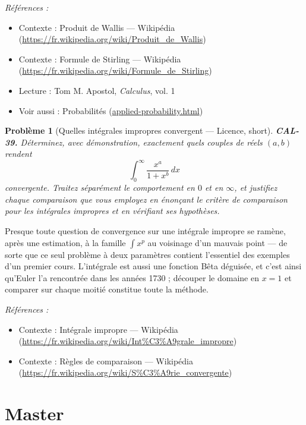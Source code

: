 \documentclass[11pt]{article}
\newtheorem{problem}{Problème}
\newenvironment{refs}{\par\small\noindent\emph{Références :}\begin{itemize}\setlength\itemsep{0pt}}{\end{itemize}\normalsize}
\begin{document}
\begin{refs}
\item Contexte : Produit de Wallis --- Wikipédia (\url{https://fr.wikipedia.org/wiki/Produit_de_Wallis})
\item Contexte : Formule de Stirling --- Wikipédia (\url{https://fr.wikipedia.org/wiki/Formule_de_Stirling})
\item Lecture : Tom M. Apostol, \textit{Calculus}, vol. 1
\item Voir aussi : Probabilités (\url{applied-probability.html})
\end{refs}

\bigskip

\begin{problem}[{Quelles intégrales impropres convergent --- Licence, short}]
\textbf{CAL-39.} Déterminez, avec démonstration, exactement quels couples de réels
$ (a,b) $ rendent
\[ \int_0^{\infty} \frac{x^{a}}{1+x^{b}}\,dx \]
convergente. Traitez séparément le comportement en $ 0 $ et en $ \infty $, et justifiez chaque
comparaison que vous employez en énonçant le critère de comparaison pour les intégrales impropres et en vérifiant ses
hypothèses.
\end{problem}

\noindent Presque toute question de convergence sur une intégrale impropre se ramène, après
une estimation, à la famille $ \int x^{p} $ au voisinage d'un mauvais point --- de sorte que ce seul problème à deux
paramètres contient l'essentiel des exemples d'un premier cours. L'intégrale est aussi une
fonction Bêta déguisée, et c'est ainsi qu'Euler l'a rencontrée dans les années 1730 ; découper le domaine en
$ x = 1 $ et comparer sur chaque moitié constitue toute la méthode.

\begin{refs}
\item Contexte : Intégrale impropre --- Wikipédia (\url{https://fr.wikipedia.org/wiki/Int%C3%A9grale_impropre})
\item Contexte : Règles de comparaison --- Wikipédia (\url{https://fr.wikipedia.org/wiki/S%C3%A9rie_convergente})
\end{refs}

\bigskip


\section*{Master}
\end{document}
